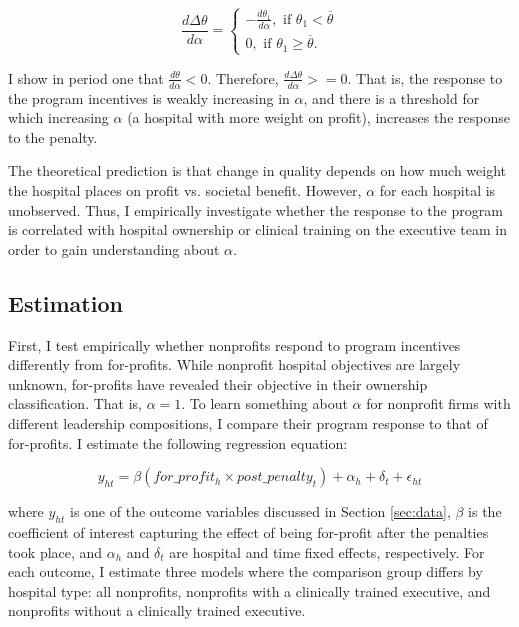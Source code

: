 \documentclass[12pt]{article}
\begin{document}
    $$\frac{d\Delta\theta}{d\alpha} = \begin{cases}
        -\frac{d\theta_1}{d\alpha}, \text{  if  } \theta_1<\overline{\theta}\\
        0, \text{  if  } \theta_1\geq \overline{\theta}.
    \end{cases}$$

    I show in period one that $\frac{d\theta}{d\alpha}<0$. Therefore, $\frac{d\Delta\theta}{d\alpha}>=0$. That is, the response to the program incentives is weakly increasing in $\alpha$, and there is a threshold for which increasing $\alpha$ (a hospital with more weight on profit), increases the response to the penalty. 

    The theoretical prediction is that change in quality depends on how much weight the hospital places on profit vs. societal benefit. However, $\alpha$ for each hospital is unobserved. Thus, I empirically investigate whether the response to the program is correlated with hospital ownership or clinical training on the executive team in order to gain understanding about $\alpha$. 

    \subsection{Estimation}

    First, I test empirically whether nonprofits respond to program incentives differently from for-profits. While nonprofit hospital objectives are largely unknown, for-profits have revealed their objective in their ownership classification. That is, $\alpha=1$. To learn something about $\alpha$ for nonprofit firms with different leadership compositions, I compare their program response to that of for-profits. I estimate the following regression equation:

    \begin{equation}
    \label{eq:forprofit}
    y_{ht} = \beta (for\_profit_h \times post\_penalty_t) + \alpha_{h} + \delta_t + \epsilon_{ht}
    \end{equation}

    \noindent where $y_{ht}$ is one of the outcome variables discussed in Section \ref{sec:data}, $\beta$ is the coefficient of interest capturing the effect of being for-profit after the penalties took place, and $\alpha_h$ and $\delta_t$ are hospital and time fixed effects, respectively. For each outcome, I estimate three models where the comparison group differs by hospital type: all nonprofits, nonprofits with a clinically trained executive, and nonprofits without a clinically trained executive.
\end{document}
